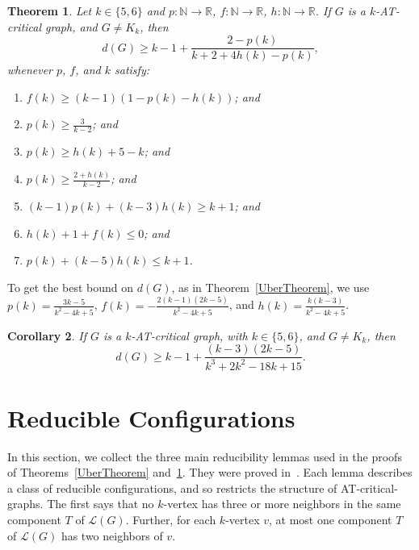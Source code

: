 \documentclass[12pt]{article}
\theoremstyle{plain}
\newtheorem{thm}{Theorem}[section]
\newtheorem{cor}[thm]{Corollary}
\theoremstyle{definition}
\newtheorem{defn}{Definition}
\theoremstyle{remark}
\newcommand{\fancy}[1]{\mathcal{#1}}
\newcommand{\IN}{\mathbb{N}}
\newcommand{\IR}{\mathbb{R}}
\renewcommand{\L}{\fancy{L}}
\newcommand{\func}[3]{#1\colon #2 \rightarrow #3}
\newcommand{\DefinedAs}{\mathrel{\mathop:}=}
\begin{document}
\begin{thm}\label{Uber56}
	Let $k \in\{5,6\}$ and $\func{p}{\IN}{\IR}$, $\func{f}{\IN}{\IR}$, $\func{h}{\IN}{\IR}$.  If $G$ is a $k$-AT-critical graph, and $G\ne K_k$, then 
	\[d(G) \ge k-1 + \frac{2-p(k)}{k+2 + 4h(k) - p(k)},\]
	whenever $p$, $f$, and $k$ satisfy:
	\begin{enumerate}
	\item $f(k) \ge (k-1)(1- p(k) - h(k))$; and	
	    \item $p(k) \ge \frac{3}{k-2}$; and
		\item $p(k) \ge h(k) + 5 - k$; and
		\item $p(k) \ge \frac{2+h(k)}{k-2}$; and
		\item $(k-1)p(k) + (k-3)h(k) \ge k+1$; and
		\item $h(k) + 1 + f(k) \le 0$; and
		\item $p(k) + (k-5)h(k) \le k+1$.
	\end{enumerate}
\end{thm}

To get the best bound on $d(G)$, as in Theorem~\ref{UberTheorem}, we use $p(k)
= \frac{3k-5}{k^2 - 4k + 5}$, $f(k) = -\frac{2(k-1)(2k-5)}{k^2 - 4k + 5}$, and
$h(k) = \frac{k(k-3)}{k^2 - 4k + 5}$.
\begin{cor}\label{MinorCor}
If $G$ is a $k$-AT-critical graph, with $k\in\{5,6\}$, and $G\ne K_k$, then
 \[d(G) \ge k-1 + \frac{(k-3)(2k-5)}{k^3 + 2k^2 - 18k + 15}.\]
\end{cor}

\section{Reducible Configurations}
In this section, we collect the three main reducibility lemmas used in the
proofs of Theorems~\ref{UberTheorem} and~\ref{Uber56}.  They were proved
in~\cite{OreVizing}.  Each lemma describes a class of reducible configurations,
and so restricts the structure of AT-critical-graphs.
%
The first says that no $k$-vertex has three or more neighbors in the same component
$T$ of $\L(G)$.  Further, for each $k$-vertex $v$,  at most one component $T$ of
$\L(G)$ has two neighbors of $v$.
\end{document}
